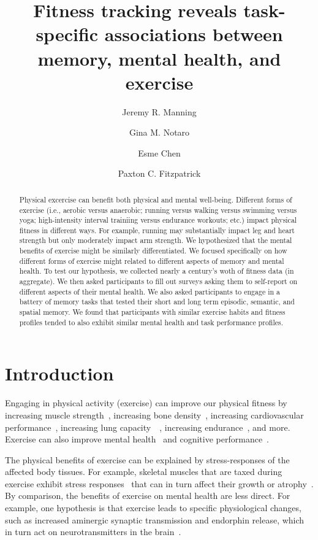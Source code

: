 \documentclass[10pt]{article}
\title{Fitness tracking reveals task-specific associations between
  memory, mental health, and exercise}
\author[1, $\star$]{Jeremy R. Manning}
\author[1,2]{Gina M. Notaro}
\author[1]{Esme Chen}
\author[1]{Paxton C. Fitzpatrick}
\affil[1]{Dartmouth College, Hanover, NH}
\affil[2]{Lockheed Martin, Bethesda, MD}
\affil[$\star$]{Address correspondence to jeremy.r.manning@dartmouth.edu}
\begin{document}
\maketitle

\begin{abstract}
  Physical excercise can benefit both physical and mental well-being.
  Different forms of exercise (i.e., aerobic versus anaerobic; running
  versus walking versus swimming versus yoga; high-intensity interval
  trainiing versus endurance workouts; etc.) impact physical fitness
  in different ways.  For example, running may substantially impact
  leg and heart strength but only moderately impact arm strength. We
  hypothesized that the mental benefits of exercise might be similarly
  differentiated.  We focused specifically on how different forms of
  exercise might related to different aspects of memory and mental
  health.  To test our hypothesis, we collected nearly a century's
  woth of fitness data (in aggregate).  We then asked participants to
  fill out surveys asking them to self-report on different aspects of
  their mental health.  We also asked participants to engage in a
  battery of memory tasks that tested their short and long term
  episodic, semantic, and spatial memory.  We found that participants
  with similar exercise habits and fitness profiles tended to also
  exhibit similar mental health and task performance profiles.
\end{abstract}

\section*{Introduction}
Engaging in physical activity (exercise) can improve our physical
fitness by increasing muscle strength~\citep{RogeEvan93, Lind79,
  CranEtal13, Knut07}, increasing bone density~\citep{ChilEtal12,
  BassRams94, LaynNels99}, increasing cardiovascular
performance~\citep{MaioEtal00, PollEtal00}, increasing lung
capacity~\citep{LazoEtal16}~\citep[although see][]{RomaEtal16},
increasing endurance~\citep{WilmKnut03}, and more.  Exercise can also
improve mental health~\citep{Ragl90, MikkEtal17, TaylEtal85,
  DeslEtal09, Call04, PaluSchw00, BassSuzu17} and cognitive performance~\citep{ChanEtal12b,
  BrisEtal02, EtniEtal06, BassSuzu17}.

The physical benefits of exercise can be explained by stress-responses
of the affected body tissues. For example, skeletal muscles that are
taxed during exercise exhibit stress responses~\citep{MortEtal09} that
can in turn affect their growth or atrophy~\citep{SchiEtal13}.  By
comparison, the benefits of exercise on mental health are less direct.  For
example, one hypothesis is that exercise leads to specific
physiological changes, such as increased aminergic synaptic
transmission and endorphin release, which in turn act on
neurotransmitters in the brain~\citep{PaluSchw00}.
\end{document}

